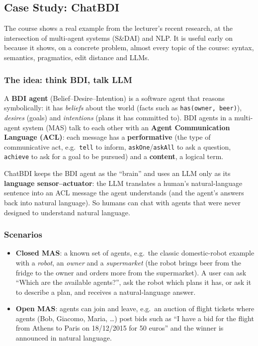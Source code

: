 \subsection{Case Study: ChatBDI}
\label{sec:chatbdi}

The course shows a real example from the lecturer's recent research, at the
intersection of multi-agent systems (S\&DAI) and NLP. It is useful early on because it
shows, on a concrete problem, almost every topic of the course: syntax, semantics,
pragmatics, edit distance and LLMs.

\subsubsection{The idea: think BDI, talk LLM}

A \textbf{BDI agent} (Belief--Desire--Intention) is a software agent that reasons
symbolically: it has \emph{beliefs} about the world (facts such as
\texttt{has(owner, beer)}), \emph{desires} (goals) and \emph{intentions} (plans it has
committed to). BDI agents in a multi-agent system (MAS) talk to each other with an
\textbf{Agent Communication Language (ACL)}: each message has a
\textbf{performative} (the type of communicative act, e.g.\ \texttt{tell} to inform,
\texttt{askOne}/\texttt{askAll} to ask a question, \texttt{achieve} to ask for a goal
to be pursued) and a \textbf{content}, a logical term.

ChatBDI keeps the BDI agent as the ``brain'' and uses an LLM only as its
\textbf{language sensor--actuator}: the LLM translates a human's natural-language sentence
into an ACL message the agent understands (and the agent's answers back into natural
language). So humans can chat with agents that were never designed to understand
natural language.

\subsubsection{Scenarios}

\begin{itemize}[nosep]
  \item \textbf{Closed MAS}: a known set of agents, e.g.\ the classic domestic-robot
        example with a \emph{robot}, an \emph{owner} and a \emph{supermarket} (the robot
        brings beer from the fridge to the owner and orders more from the supermarket).
        A user can ask ``Which are the available agents?'', ask the robot which plans it
        has, or ask it to describe a plan, and receives a natural-language answer.
  \item \textbf{Open MAS}: agents can join and leave, e.g.\ an auction of flight tickets
        where agents (Bob, Giacomo, Maria, \ldots) post bids such as ``I have a bid for the
        flight from Athens to Paris on 18/12/2015 for 50 euros'' and the winner is
        announced in natural language.
\end{itemize}

